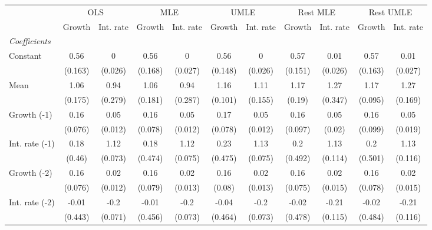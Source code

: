 \begin{table}[htbp] 
	\centering 
	\begin{tabular}{@{\extracolsep{4pt}}lcccccccccc@{}}		\hline\hline
		 		 & \multicolumn{2}{c}{OLS} &\multicolumn{2}{c}{MLE} &\multicolumn{2}{c}{UMLE} &\multicolumn{2}{c}{Rest MLE} &\multicolumn{2}{c}{Rest UMLE} \\ 
 		 & Growth 	 & Int. rate 	 & Growth 	 & Int. rate 	 & Growth 	 & Int. rate 	 & Growth 	 & Int. rate 	 & Growth 	 & Int. rate\\\cline{2-3}\cline{4-5}\cline{6-7}\cline{8-9}\cline{10-11}
\rule{0pt}{4ex} 
 \emph{Coefficients} 	  		 & 		 & 		 & 		 & 		 & 		 & 		 & 		 & 		 & 		 &\\ 
\quad Constant 	 & 0.56 	 & 0 	 & 0.56 	 & 0 	 & 0.56 	 & 0 	 & 0.57 	 & 0.01 	 & 0.57 	 & 0.01	 \\ 
 		 & (0.163) 	 & (0.026) 	 & (0.168) 	 & (0.027) 	 & (0.148) 	 & (0.026) 	 & (0.151) 	 & (0.026) 	 & (0.163) 	 & (0.027) 	 \\ 
\quad Mean 	 & 1.06 	 & 0.94 	 & 1.06 	 & 0.94 	 & 1.16 	 & 1.11 	 & 1.17 	 & 1.27 	 & 1.17 	 & 1.27	 \\ 
 		 & (0.175) 	 & (0.279) 	 & (0.181) 	 & (0.287) 	 & (0.101) 	 & (0.155) 	 & (0.19) 	 & (0.347) 	 & (0.095) 	 & (0.169) 	 \\ 
\quad Growth (-1) 	 &0.16 	 & 0.05 	 & 0.16 	 & 0.05 	 & 0.17 	 & 0.05 	 & 0.16 	 & 0.05 	 & 0.16 	 & 0.05	 \\ 
 		 & (0.076) 	 & (0.012) 	 & (0.078) 	 & (0.012) 	 & (0.078) 	 & (0.012) 	 & (0.097) 	 & (0.02) 	 & (0.099) 	 & (0.019) 	 \\ 
\quad Int. rate (-1) 	 &0.18 	 & 1.12 	 & 0.18 	 & 1.12 	 & 0.23 	 & 1.13 	 & 0.2 	 & 1.13 	 & 0.2 	 & 1.13	 \\ 
 		 & (0.46) 	 & (0.073) 	 & (0.474) 	 & (0.075) 	 & (0.475) 	 & (0.075) 	 & (0.492) 	 & (0.114) 	 & (0.501) 	 & (0.116) 	 \\ 
\quad Growth (-2) 	 &0.16 	 & 0.02 	 & 0.16 	 & 0.02 	 & 0.16 	 & 0.02 	 & 0.16 	 & 0.02 	 & 0.16 	 & 0.02	 \\ 
 		 & (0.076) 	 & (0.012) 	 & (0.079) 	 & (0.013) 	 & (0.08) 	 & (0.013) 	 & (0.075) 	 & (0.015) 	 & (0.078) 	 & (0.015) 	 \\ 
\quad Int. rate (-2) 	 &-0.01 	 & -0.2 	 & -0.01 	 & -0.2 	 & -0.04 	 & -0.2 	 & -0.02 	 & -0.21 	 & -0.02 	 & -0.21	 \\ 
 		 & (0.443) 	 & (0.071) 	 & (0.456) 	 & (0.073) 	 & (0.464) 	 & (0.073) 	 & (0.478) 	 & (0.115) 	 & (0.484) 	 & (0.116) 	 \\ 

\end{tabular}
\end{table}
